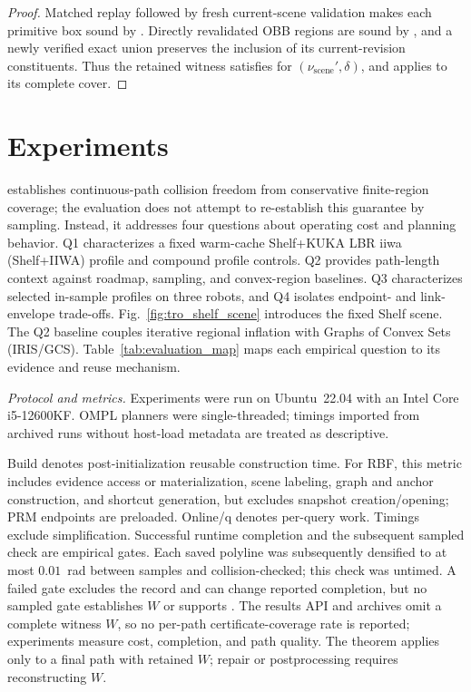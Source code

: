 \documentclass[journal]{IEEEtran}
\newcommand{\rbf}{RBF}
\newcommand{\onlineq}{\mbox{Online/q}}
\begin{document}
\begin{proof}
Matched replay followed by fresh current-scene validation makes each primitive
box sound by . Directly revalidated OBB regions are
sound by , and a newly verified exact union preserves the
inclusion of its current-revision constituents. Thus the retained witness
satisfies  for $(\nu_{\mathrm{scene}}',\delta)$, and
 applies to its complete cover.
\end{proof}

\section{Experiments}\label{sec:exp}

 establishes continuous-path collision freedom
from conservative finite-region coverage; the evaluation does not attempt to
re-establish this guarantee by sampling. Instead, it addresses four questions
about operating cost and planning behavior. Q1 characterizes a fixed warm-cache
Shelf+KUKA LBR iiwa (Shelf+IIWA) profile and compound profile controls. Q2
provides path-length context against roadmap, sampling, and convex-region
baselines. Q3 characterizes selected in-sample profiles on three robots, and Q4
isolates endpoint- and link-envelope trade-offs.
Fig.~\ref{fig:tro_shelf_scene} introduces the fixed Shelf scene.
The Q2 baseline couples iterative regional inflation with Graphs of Convex Sets
(IRIS/GCS).
Table~\ref{tab:evaluation_map} maps each empirical question to its evidence and
reuse mechanism.

\noindent\emph{Protocol and metrics.}
Experiments were run on Ubuntu~22.04 with an Intel Core i5-12600KF\@. OMPL
planners were single-threaded; timings imported from archived runs without
host-load metadata are treated as descriptive.

Build denotes post-initialization reusable construction time. For \rbf{}, this
metric includes
evidence access or materialization, scene labeling, graph and anchor construction,
and shortcut generation, but excludes snapshot creation/opening; PRM endpoints are
preloaded. \onlineq{} denotes per-query work. Timings exclude simplification.
Successful runtime completion and the subsequent sampled check are empirical
gates. Each saved polyline was subsequently densified to at most $0.01$~rad
between samples and collision-checked;
this check was untimed. A failed gate excludes the record and can change reported
completion, but no sampled gate establishes $W$ or supports
. The results API and archives omit a complete
witness $W$, so no per-path certificate-coverage rate is reported; experiments
measure cost, completion, and path quality. The theorem applies only to a final
path with retained $W$; repair or postprocessing requires reconstructing $W$.
\end{document}

